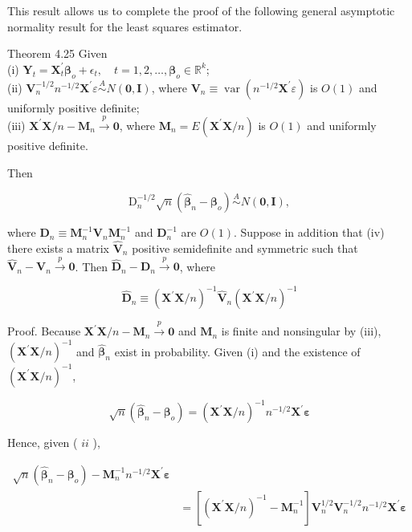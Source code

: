 \documentclass[10pt]{article}
\begin{document}
This result allows us to complete the proof of the following general asymptotic normality result for the least squares estimator.

Theorem 4.25 Given\\
(i) $\mathbf{Y}_{t}=\mathbf{X}_{t}^{\prime} \boldsymbol{\beta}_{o}+\epsilon_{t}, \quad t=1,2, \ldots, \boldsymbol{\beta}_{o} \in \mathbb{R}^{k}$;\\
(ii) $\mathbf{V}_{n}^{-1 / 2} n^{-1 / 2} \mathbf{X}^{\prime} \varepsilon \stackrel{A}{\sim} N(\mathbf{0}, \mathbf{I})$, where $\mathbf{V}_{n} \equiv \operatorname{var}\left(n^{-1 / 2} \mathbf{X}^{\prime} \varepsilon\right)$ is $O(1)$ and uniformly positive definite;\\
(iii) $\mathbf{X}^{\prime} \mathbf{X} / n-\mathbf{M}_{n} \xrightarrow{p} \mathbf{0}$, where $\mathbf{M}_{n}=E\left(\mathbf{X}^{\prime} \mathbf{X} / n\right)$ is $O(1)$ and uniformly positive definite.

Then

$$
\mathrm{D}_{n}^{-1 / 2} \sqrt{n}\left(\hat{\boldsymbol{\beta}}_{n}-\boldsymbol{\beta}_{o}\right) \stackrel{A}{\sim} N(\mathbf{0}, \mathbf{I}),
$$

where $\mathbf{D}_{n} \equiv \mathbf{M}_{n}^{-1} \mathbf{V}_{n} \mathbf{M}_{n}^{-1}$ and $\mathbf{D}_{n}^{-1}$ are $O(1)$. Suppose in addition that (iv) there exists a matrix $\hat{\mathbf{V}}_{n}$ positive semidefinite and symmetric such that $\hat{\mathbf{V}}_{n}-\mathbf{V}_{n} \xrightarrow{p} \mathbf{0}$. Then $\hat{\mathbf{D}}_{n}-\mathbf{D}_{n} \xrightarrow{p} \mathbf{0}$, where

$$
\hat{\mathbf{D}}_{n} \equiv\left(\mathbf{X}^{\prime} \mathbf{X} / n\right)^{-1} \hat{\mathbf{V}}_{n}\left(\mathbf{X}^{\prime} \mathbf{X} / n\right)^{-1}
$$

Proof. Because $\mathbf{X}^{\prime} \mathbf{X} / n-\mathbf{M}_{n} \xrightarrow{p} \mathbf{0}$ and $\mathbf{M}_{n}$ is finite and nonsingular by (iii), $\left(\mathbf{X}^{\prime} \mathbf{X} / n\right)^{-1}$ and $\hat{\boldsymbol{\beta}}_{n}$ exist in probability. Given (i) and the existence of $\left(\mathbf{X}^{\prime} \mathbf{X} / n\right)^{-1}$,

$$
\sqrt{n}\left(\hat{\boldsymbol{\beta}}_{n}-\boldsymbol{\beta}_{o}\right)=\left(\mathbf{X}^{\prime} \mathbf{X} / n\right)^{-1} n^{-1 / 2} \mathbf{X}^{\prime} \boldsymbol{\varepsilon}
$$

Hence, given ( $i i$ ),

$$
\begin{aligned}
\sqrt{n}\left(\hat{\boldsymbol{\beta}}_{n}-\boldsymbol{\beta}_{o}\right)-\mathbf{M}_{n}^{-1} n^{-1 / 2} \mathbf{X}^{\prime} \boldsymbol{\varepsilon} & \\
& =\left[\left(\mathbf{X}^{\prime} \mathbf{X} / n\right)^{-1}-\mathbf{M}_{n}^{-1}\right] \mathbf{V}_{n}^{1 / 2} \mathbf{V}_{n}^{-1 / 2} n^{-1 / 2} \mathbf{X}^{\prime} \boldsymbol{\varepsilon}
\end{aligned}
$$
\end{document}
